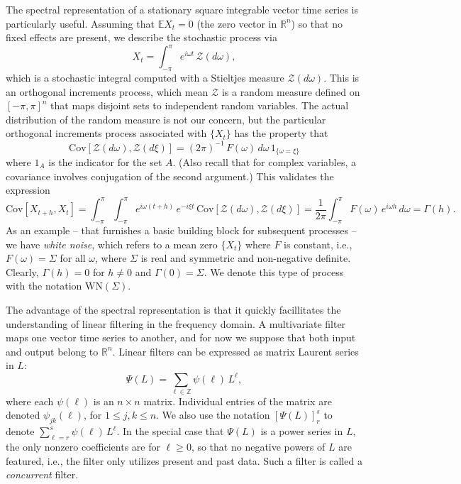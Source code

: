 \documentclass[a4paper]{book}
\def\RR{\mathbb R}
\def\ZZ{\mathbb Z}
\def\EE{\mathbb E}
\begin{document}
 The spectral representation of a stationary square integrable vector 
time series is particularly useful.  Assuming that $\EE X_t = 0$ (the
 zero vector in $\RR^n$) so that no fixed effects are present, we describe
 the stochastic process via
\begin{equation}
\label{eq:specRep}
  X_t = \int_{-\pi}^{\pi} e^{i \omega t} \, \mathcal{Z} (d\omega),
\end{equation}
 which is a stochastic integral computed with a Stieltjes measure
 $\mathcal{Z} (d\omega)$.  This is an orthogonal increments process,
 which mean $\mathcal{Z}$ is a random measure defined on ${[-\pi,\pi]}^n$
 that maps disjoint sets to independent random variables.  The actual
 distribution of the random measure is not our concern, but the particular
 orthogonal increments process associated with $\{ X_t \}$ has the 
 property that
\[
  \mbox{Cov} [ \mathcal{Z} (d\omega), \mathcal{Z} (d\xi) ]
   = {(2 \pi)}^{-1} \, F (\omega) \, d\omega \, 1_{ \{   \omega = \xi \} }
\]
 where $1_A$ is the indicator for the set $A$.
  (Also recall that for complex variables, a 
covariance involves conjugation of
 the second argument.)  This validates the expression
\[
  \mbox{Cov} [ X_{t+h}, X_t ] =
 \int_{-\pi}^{\pi}  \int_{-\pi}^{\pi} e^{i \omega (t+h)} \,
  e^{-i \xi t } \, \mbox{Cov} [ \mathcal{Z} (d\omega), 
  \mathcal{Z} (d\xi) ] 
 =  \frac{1}{2 \pi} \int_{-\pi}^{\pi} F(\omega) \, e^{i \omega h}
  \, d\omega = \Gamma (h).
\]
 As an example -- that furnishes a basic building block for subsequent processes --
 we have {\em white noise}, which refers to a mean zero $\{ X_t \}$ 
 where $F$ is constant, i.e.,
 $F(\omega) = \Sigma$ for all $\omega$, where $\Sigma $ is real and symmetric and
 non-negative definite.  Clearly, $\Gamma (h) = 0$ for $h \neq 0$ and $\Gamma (0) = \Sigma$.
 We denote this type of process with the notation $\mbox{WN} (\Sigma)$.

 The advantage of the spectral representation is that it quickly facillitates
 the understanding of linear filtering in the frequency domain.
 A multivariate filter maps one vector time series to another, and for
 now we suppose that both input and output belong to $\RR^n$.
 Linear filters can be expressed as matrix Laurent series in $L$:
\[
 \Psi (L) = \sum_{\ell \in \ZZ} \psi (\ell) \, L^{\ell},
\]
 where each $\psi (\ell)$ is an $n \times n$ matrix.  
 Individual entries of the matrix are denoted $\psi_{jk} (\ell)$,
 for $1 \leq j, k \leq n$.   We also use the notation
  $ {[\Psi (L) ]}^{s}_r $ to denote $\sum_{\ell=r}^s
  \psi (\ell) \, L^{\ell}$. In the special case that $\Psi (L)$ is a power
 series in $L$, the only nonzero coefficients are for $\ell \geq 0$, 
 so that no negative powers of $L$ are featured, i.e., the filter
 only utilizes present and past data.  Such a filter is called a 
 {\em concurrent} filter.  
\end{document}
